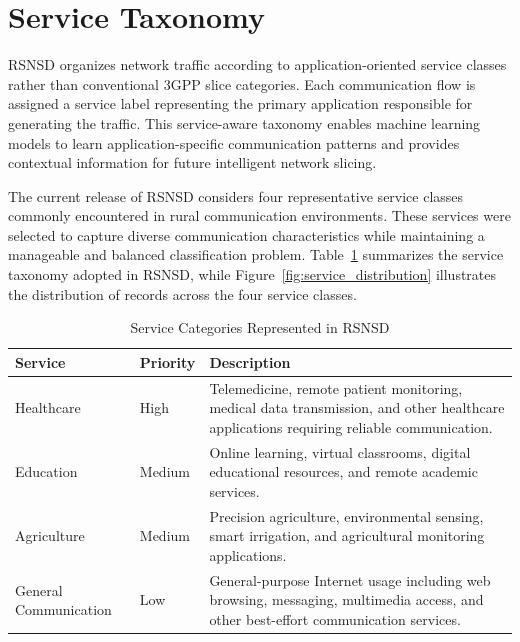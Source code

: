 \documentclass[12pt,a4paper]{report}
\begin{document}
	
	\section{Service Taxonomy}
	\label{sec:services}
	
	RSNSD organizes network traffic according to application-oriented service classes rather than conventional 3GPP slice categories. Each communication flow is assigned a service label representing the primary application responsible for generating the traffic. This service-aware taxonomy enables machine learning models to learn application-specific communication patterns and provides contextual information for future intelligent network slicing.
	
	The current release of RSNSD considers four representative service classes commonly encountered in rural communication environments. These services were selected to capture diverse communication characteristics while maintaining a manageable and balanced classification problem. Table~\ref{tab:services} summarizes the service taxonomy adopted in RSNSD, while Figure~\ref{fig:service_distribution} illustrates the distribution of records across the four service classes.
	
	\begin{table}[H]
		\centering
		\caption{Service Categories Represented in RSNSD}
		\label{tab:services}
		
		\begin{tabular}{|p{4cm}|p{2cm}|p{8cm}|}
			\hline
			
			\textbf{Service} &
			\textbf{Priority} &
			\textbf{Description}
			\\
			\hline
			
			Healthcare &
			High &
			Telemedicine, remote patient monitoring, medical data transmission, and other healthcare applications requiring reliable communication.
			\\
			\hline
			
			Education &
			Medium &
			Online learning, virtual classrooms, digital educational resources, and remote academic services.
			\\
			\hline
			
			Agriculture &
			Medium &
			Precision agriculture, environmental sensing, smart irrigation, and agricultural monitoring applications.
			\\
			\hline
			
			General Communication &
			Low &
			General-purpose Internet usage including web browsing, messaging, multimedia access, and other best-effort communication services.
			\\
			\hline
			
		\end{tabular}
		
	\end{table}
	
\end{document}
